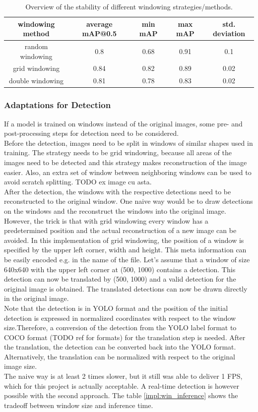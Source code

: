 \begin{table}
\centering
\begin{tabular}{ ||c|c|c|c|c||}
\hline
windowing method & average mAP@0.5 & min mAP & max mAP & std. deviation\\ [0.5ex]
\hline\hline
random windowing & 0.8 & 0.68 & 0.91 & 0.1 \\
grid windowing & 0.84  & 0.82 & 0.89 & 0.02 \\
double windowing & 0.81  & 0.78 & 0.83 & 0.02 \\
\hline
\end{tabular}
\label{impl:win_strategy}
\caption{Overview of the stability of different windowing strategies/methods.}
\end{table}

\subsubsection{Adaptations for Detection}
If a model is trained on windows instead of the original images, some pre- and post-processing steps for detection need to be considered. \\
Before the detection, images need to be split in windows of similar shapes used in training. The strategy needs to be grid windowing, because all areas of the images need to be detected and this strategy makes reconstruction of the image easier. Also, an extra set of window between neighboring windows can be used to avoid scratch splitting. TODO ex image cu asta. \\
After the detection, the windows with the respective detections need to be reconstructed to the original window. One naive way would be to draw detections on the windows and the reconstruct the windows into the original image. However, the trick is that with grid windowing every window has a predetermined position and the actual reconstruction of a new image can be avoided. In this implementation of grid windowing, the position of a window is specified by the upper left corner, width and height. This meta information can be easily encoded e.g. in the name of the file. Let's assume that a window of size 640x640 with the upper left corner at (500, 1000) contains a detection. This detection can now be translated by (500, 1000) and a valid detection for the original image is obtained. The translated detections can now be drawn directly in the original image.\\
Note that the detection is in YOLO format and the position of the initial detection is expressed in normalized coordinates with respect to the window size.Therefore, a conversion of the detection from the YOLO label format to COCO format (TODO ref for formats) for the translation step is needed. After the translation, the detection can be converted back into the YOLO format.  Alternatively, the translation can be normalized with respect to the original image size.\\
The naive way is at least 2 times slower, but it still was able to deliver 1 FPS, which for this project is actually acceptable. A real-time detection is however possible with the second approach. The table \ref{impl:win_inference} shows the tradeoff between window size and inference time. \\

